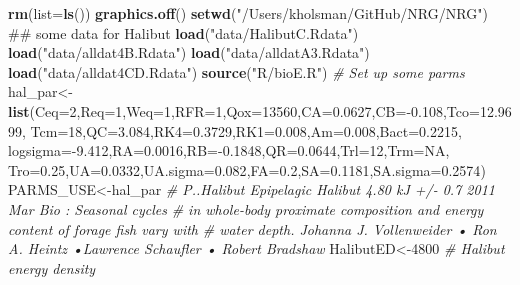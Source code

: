 \documentclass[]{article}
\newenvironment{Shaded}{\begin{snugshade}}{\end{snugshade}}
\newcommand{\KeywordTok}[1]{\textcolor[rgb]{0.13,0.29,0.53}{\textbf{{#1}}}}
\newcommand{\DataTypeTok}[1]{\textcolor[rgb]{0.13,0.29,0.53}{{#1}}}
\newcommand{\DecValTok}[1]{\textcolor[rgb]{0.00,0.00,0.81}{{#1}}}
\newcommand{\FloatTok}[1]{\textcolor[rgb]{0.00,0.00,0.81}{{#1}}}
\newcommand{\StringTok}[1]{\textcolor[rgb]{0.31,0.60,0.02}{{#1}}}
\newcommand{\CommentTok}[1]{\textcolor[rgb]{0.56,0.35,0.01}{\textit{{#1}}}}
\newcommand{\OtherTok}[1]{\textcolor[rgb]{0.56,0.35,0.01}{{#1}}}
\newcommand{\NormalTok}[1]{{#1}}
\begin{document}
\begin{Shaded}
\begin{Highlighting}[]
  \KeywordTok{rm}\NormalTok{(}\DataTypeTok{list=}\KeywordTok{ls}\NormalTok{())}
  \KeywordTok{graphics.off}\NormalTok{()}
  \KeywordTok{setwd}\NormalTok{(}\StringTok{"/Users/kholsman/GitHub/NRG/NRG"}\NormalTok{)}
  \NormalTok{## some data for Halibut}
    \KeywordTok{load}\NormalTok{(}\StringTok{"data/HalibutC.Rdata"}\NormalTok{)}
    \KeywordTok{load}\NormalTok{(}\StringTok{"data/alldat4B.Rdata"}\NormalTok{)}
    \KeywordTok{load}\NormalTok{(}\StringTok{"data/alldatA3.Rdata"}\NormalTok{)}
    \KeywordTok{load}\NormalTok{(}\StringTok{"data/alldat4CD.Rdata"}\NormalTok{)}
    \KeywordTok{source}\NormalTok{(}\StringTok{"R/bioE.R"}\NormalTok{)}
  \CommentTok{# Set up some parms}
    \NormalTok{hal_par<-}\KeywordTok{list}\NormalTok{(}\DataTypeTok{Ceq=}\DecValTok{2}\NormalTok{,}\DataTypeTok{Req=}\DecValTok{1}\NormalTok{,}\DataTypeTok{Weq=}\DecValTok{1}\NormalTok{,}\DataTypeTok{RFR=}\DecValTok{1}\NormalTok{,}\DataTypeTok{Qox=}\DecValTok{13560}\NormalTok{,}\DataTypeTok{CA=}\FloatTok{0.0627}\NormalTok{,}\DataTypeTok{CB=}\NormalTok{-}\FloatTok{0.108}\NormalTok{,}\DataTypeTok{Tco=}\FloatTok{12.9699}\NormalTok{,}
                  \DataTypeTok{Tcm=}\DecValTok{18}\NormalTok{,}\DataTypeTok{QC=}\FloatTok{3.084}\NormalTok{,}\DataTypeTok{RK4=}\FloatTok{0.3729}\NormalTok{,}\DataTypeTok{RK1=}\FloatTok{0.008}\NormalTok{,}\DataTypeTok{Am=}\FloatTok{0.008}\NormalTok{,}\DataTypeTok{Bact=}\FloatTok{0.2215}\NormalTok{,}
                  \DataTypeTok{logsigma=}\NormalTok{-}\FloatTok{9.412}\NormalTok{,}\DataTypeTok{RA=}\FloatTok{0.0016}\NormalTok{,}\DataTypeTok{RB=}\NormalTok{-}\FloatTok{0.1848}\NormalTok{,}\DataTypeTok{QR=}\FloatTok{0.0644}\NormalTok{,}\DataTypeTok{Trl=}\DecValTok{12}\NormalTok{,}\DataTypeTok{Trm=}\OtherTok{NA}\NormalTok{,}
                  \DataTypeTok{Tro=}\FloatTok{0.25}\NormalTok{,}\DataTypeTok{UA=}\FloatTok{0.0332}\NormalTok{,}\DataTypeTok{UA.sigma=}\FloatTok{0.082}\NormalTok{,}\DataTypeTok{FA=}\FloatTok{0.2}\NormalTok{,}\DataTypeTok{SA=}\FloatTok{0.1181}\NormalTok{,}\DataTypeTok{SA.sigma=}\FloatTok{0.2574}\NormalTok{)}
    \NormalTok{PARMS_USE<-hal_par}
    \CommentTok{# P..Halibut    Epipelagic  Halibut  4.80 kJ  +/-   0.7 2011 Mar Bio : Seasonal cycles }
    \CommentTok{# in whole-body proximate composition and energy content of forage fish vary with }
    \CommentTok{# water depth. Johanna J. Vollenweider • Ron A. Heintz •Lawrence Schaufler • Robert Bradshaw}
    \NormalTok{HalibutED<-}\DecValTok{4800}  \CommentTok{# Halibut energy density}

\end{Highlighting}
\end{Shaded}
\end{document}
